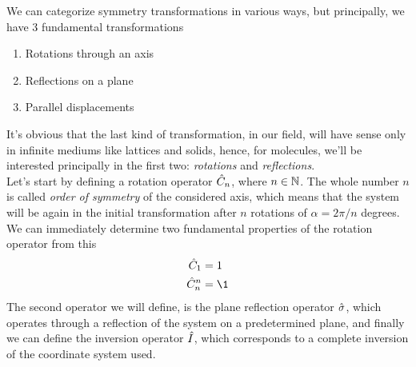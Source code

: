 \documentclass[../qm.tex]{subfiles}
\begin{document}
	We can categorize symmetry transformations in various ways, but principally, we have 3 fundamental transformations
	\begin{enumerate}
	\item Rotations through an axis
	\item Reflections on a plane
	\item Parallel displacements
	\end{enumerate}
	It's obvious that the last kind of transformation, in our field, will have sense only in infinite mediums like lattices and solids, hence, for molecules, we'll be interested principally in the first two: \textit{rotations} and \textit{reflections}.\\
	Let's start by defining a rotation operator $\hat{C}_n$, where $n\in\mathbb{N}$. The whole number $n$ is called \textit{order of symmetry} of the considered axis, which means that the system will be again in the initial transformation after $n$ rotations of $\alpha=2\pi/n$ degrees.\\
	We can immediately determine two fundamental properties of the rotation operator from this
	\begin{equation*}
		\begin{aligned}
			\opr{C}_1&=1\\
			\opr{C}_n^n&=\1
		\end{aligned}
	\end{equation*}
	The second operator we will define, is the plane reflection operator $\hat{\sigma}$, which operates through a reflection of the system on a predetermined plane, and finally we can define the inversion operator $\hat{I}$, which corresponds to a complete inversion of the coordinate system used.\\
\end{document}
